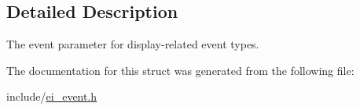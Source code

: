 \subsection{Detailed Description}
The event parameter for display-\/related event types. 

The documentation for this struct was generated from the following file\+:\begin{DoxyCompactItemize}
\item 
include/\hyperlink{ei__event_8h}{ei\+\_\+event.\+h}\end{DoxyCompactItemize}
